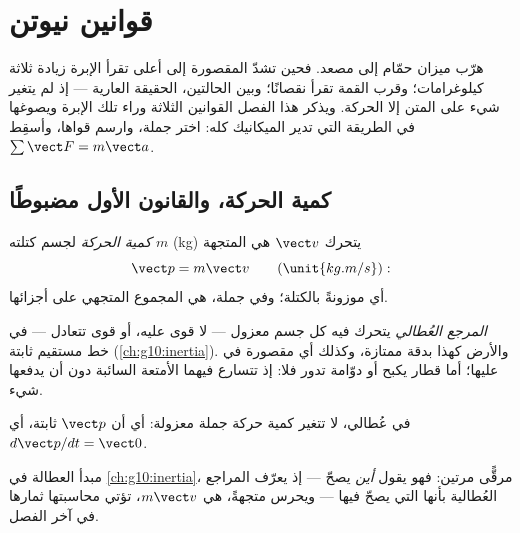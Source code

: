 \chapter{قوانين نيوتن}\label{ch:g12:newtons-laws}

هرّب ميزان حمّام إلى مصعد. فحين تشدّ المقصورة إلى أعلى تقرأ الإبرة
زيادة ثلاثة كيلوغرامات؛ وقرب القمة تقرأ نقصانًا؛ وبين الحالتين، الحقيقة العارية
--- إذ لم يتغير شيء على المتن إلا الحركة. ويذكر هذا الفصل القوانين الثلاثة وراء
تلك الإبرة ويصوغها في الطريقة التي تدير الميكانيك كله: اختر
جملة، وارسم قواها، وأسقِط $\sum \vect F = m\vect a$.

\section{كمية الحركة، والقانون الأول مضبوطًا}

\begin{definition}\label{def:g12:newtons-laws:momentum}
\emph{كمية الحركة} لجسم كتلته $m$ (\unit{kg}) يتحرك 
$\vect v$ هي المتجهة
\[
\vect p = m \vect v \qquad (\unit{kg.m/s}):
\]
أي  موزونةً بالكتلة؛ وفي جملة، هي المجموع المتجهي على أجزائها.
\end{definition}

\begin{definition}\label{def:g12:newtons-laws:inertial}
\emph{المرجع العُطالي}  يتحرك فيه
كل جسم معزول --- لا قوى عليه، أو قوى تتعادل --- في خط مستقيم
 ثابتة (\cref{ch:g10:inertia}). والأرض  كهذا بدقة ممتازة،
وكذلك أي مقصورة في  عليها؛ أما قطار يكبح
أو دوّامة تدور فلا: إذ تتسارع فيهما الأمتعة السائبة دون أن يدفعها شيء.
\end{definition}

\begin{theorem}\label{thm:g12:newtons-laws:first}
في  عُطالي، لا تتغير كمية حركة جملة معزولة: أي أن $\vect p$
ثابتة، أي\ $d\vect p/dt = \vect 0$.
\end{theorem}
\admitted

\begin{remark}\label{rem:g12:newtons-laws:sharpened}
مبدأ العطالة في \cref{ch:g10:inertia}، مرقًّى مرتين: فهو يقول
\emph{أين} يصحّ --- إذ يعرّف المراجع العُطالية بأنها التي يصحّ فيها ---
ويحرس متجهةً، هي $m\vect v$، تؤتي محاسبتها ثمارها في آخر الفصل.
\end{remark}

